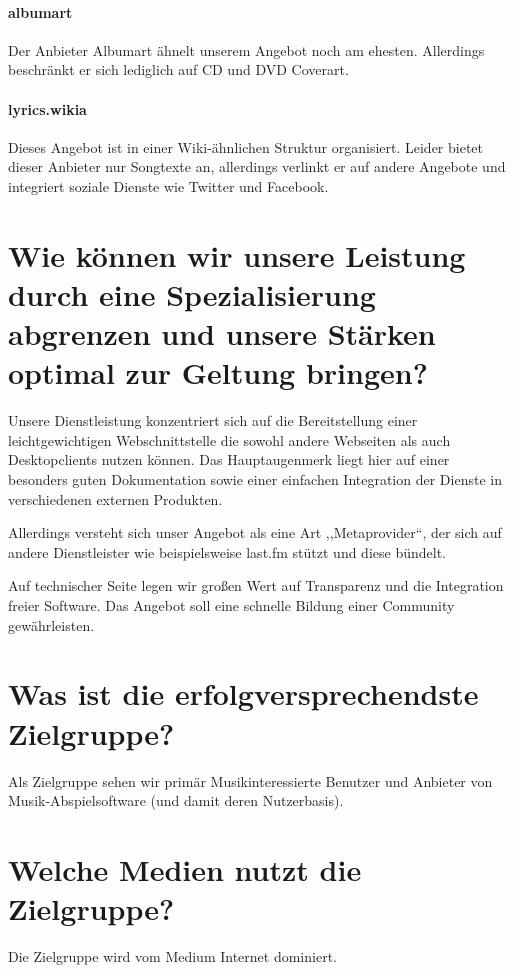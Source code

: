 \documentclass[11pt]{scrreprt}
\begin{document}
\paragraph{albumart}
Der Anbieter Albumart ähnelt unserem Angebot noch am ehesten. Allerdings
beschränkt er sich lediglich auf CD und DVD Coverart.


\paragraph{lyrics.wikia}
Dieses Angebot ist in einer Wiki-ähnlichen Struktur organisiert. Leider bietet
dieser Anbieter nur Songtexte an, allerdings verlinkt er auf andere Angebote und
integriert soziale Dienste wie Twitter und Facebook.


\section{Wie können wir unsere Leistung durch eine
Spezialisierung abgrenzen und unsere Stärken
optimal zur Geltung bringen?}
Unsere Dienstleistung konzentriert sich auf die Bereitstellung einer
leichtgewichtigen Webschnittstelle die sowohl andere Webseiten als auch
Desktopclients nutzen können. Das Hauptaugenmerk liegt hier auf einer besonders
guten Dokumentation sowie einer einfachen Integration der Dienste in
verschiedenen externen Produkten.

Allerdings versteht sich unser Angebot als eine Art ,,Metaprovider``, der sich
auf andere Dienstleister wie beispielsweise last.fm stützt und diese bündelt.

Auf technischer Seite legen wir großen Wert auf Transparenz und die Integration
freier Software. Das Angebot soll eine schnelle Bildung einer Community
gewährleisten.



\section{Was ist die erfolgversprechendste Zielgruppe?}
Als Zielgruppe sehen wir primär Musikinteressierte Benutzer und Anbieter von
Musik-Abspielsoftware (und damit deren Nutzerbasis).


\section{Welche Medien nutzt die Zielgruppe?}
Die Zielgruppe wird vom Medium Internet dominiert.
\end{document}
